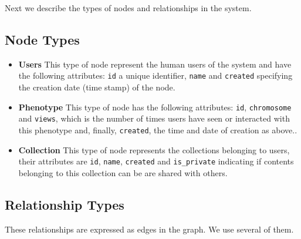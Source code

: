 \documentclass[conference]{IEEEtran}
\begin{document}
Next we describe the types of nodes and
relationships in the system. %

\subsection{Node Types}
\begin{itemize}

\item {\bf Users} This type of node represent the human users of the system and have 
the following attributes: {\tt id} a unique identifier, {\tt name}  and {\tt created}
specifying the  creation date (time stamp) of the node. 

\item {\bf Phenotype} This type of node has the following attributes: 
{\tt id}, {\tt chromosome}  and {\tt views}, which is the number of
times users have seen or interacted with this phenotype and, finally, 
 {\tt created}, the time and date of creation as above..

\item {\bf Collection} This type of node represents the collections belonging
to users, their attributes are {\tt id}, 
{\tt name}, {\tt created} and {\tt is\_private} indicating if contents
belonging to this collection can be are shared with others. 
\end{itemize}


\subsection{Relationship Types}

These relationships are expressed as edges in the graph. We use
several of them.
\end{document}
